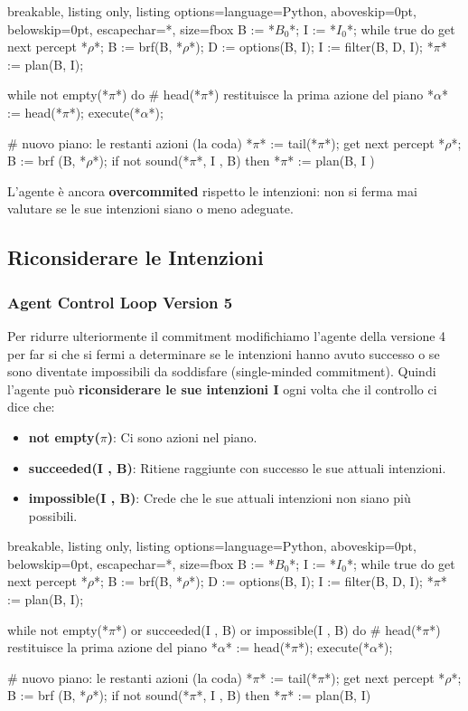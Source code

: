 \begin{tcblisting}{breakable, listing only, listing options={language=Python, aboveskip=0pt, belowskip=0pt, escapechar=*}, size=fbox}
B := *$B_0$*;
I := *$I_0$*;
while true do
    get next percept *$\rho$*;
    B := brf(B, *$\rho$*);
    D := options(B, I);
    I := filter(B, D, I);
    *$\pi$* := plan(B, I);
    
    while not empty(*$\pi$*) do
        # head(*$\pi$*) restituisce la prima azione del piano 
        *$\alpha$* := head(*$\pi$*);
        execute(*$\alpha$*);
        
        # nuovo piano: le restanti azioni (la coda)
        *$\pi$* := tail(*$\pi$*);
        get next percept *$\rho$*;
        B := brf (B, *$\rho$*);
        if not sound(*$\pi$*, I , B) then
            *$\pi$* := plan(B, I )
\end{tcblisting}

L'agente è ancora \textbf{overcommited} rispetto le intenzioni: non si ferma mai valutare se le sue intenzioni siano o meno adeguate.

\subsection{Riconsiderare le Intenzioni}
\subsubsection{Agent Control Loop Version 5}
Per ridurre ulteriormente il commitment modifichiamo l'agente della versione 4 per far si che si fermi a determinare se le intenzioni hanno avuto successo o se sono diventate impossibili da soddisfare (single-minded commitment). Quindi l'agente può \textbf{riconsiderare le sue intenzioni I} ogni volta che il controllo ci dice che:
\begin{itemize}
    \item \textbf{not empty($\pi$)}: Ci sono azioni nel piano.
    \item \textbf{succeeded(I , B)}: Ritiene raggiunte con successo le sue attuali intenzioni.
    \item \textbf{impossible(I , B)}: Crede che le sue attuali intenzioni non siano più possibili.
\end{itemize}

\begin{tcblisting}{breakable, listing only, listing options={language=Python, aboveskip=0pt, belowskip=0pt, escapechar=*}, size=fbox}
B := *$B_0$*;
I := *$I_0$*;
while true do
    get next percept *$\rho$*;
    B := brf(B, *$\rho$*);
    D := options(B, I);
    I := filter(B, D, I);
    *$\pi$* := plan(B, I);
    
    while not empty(*$\pi$*) or
         succeeded(I , B) or
         impossible(I , B) do
        # head(*$\pi$*) restituisce la prima azione del piano 
        *$\alpha$* := head(*$\pi$*);
        execute(*$\alpha$*);
        
        # nuovo piano: le restanti azioni (la coda)
        *$\pi$* := tail(*$\pi$*);
        get next percept *$\rho$*;
        B := brf (B, *$\rho$*);
        if not sound(*$\pi$*, I , B) then
            *$\pi$* := plan(B, I)
\end{tcblisting}

